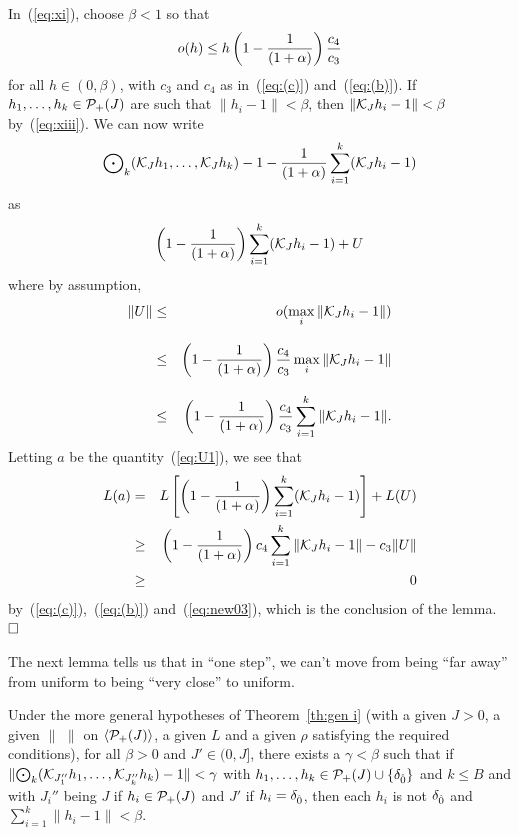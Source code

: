 In~(\ref{eq:xi}), choose $\beta<1$ so that 
$$o(h)\le h \left(1-{1 \over (1+\alpha)}\right) {c_4 \over c_3} $$
for all $h\in (0,\beta)$, with $c_3$ and $c_4$ as in~(\ref{eq:(c)})
and~(\ref{eq:(b)}). If $h_1,\ldots, h_k\in {\cal P}_+(J)$ are such that
$\|h_i-1\| < \beta$, then $\|{\cal K}_J h_i-1\| < \beta$ by~(\ref{eq:xiii}).
We can now write
\begin{equation} \label{eq:U1}
{\bigodot}_k({\cal K}_J h_1,\ldots,{\cal K}_J h_k)-1-
{1 \over (1+\alpha)}\sum_{i=1}^k ({\cal K}_J h_i-1)
\end{equation}
as 
\begin{equation} \label{eq:U2}
\left(1-{1 \over (1+\alpha)}\right)\sum_{i=1}^k ({\cal K}_J h_i-1) +U
\end{equation}
where by assumption,
\begin{eqnarray} \label{eq:new03}
\|U\| & \le & o(\max_i \|{\cal K}_J h_i-1 \|) \\[2ex]
& \le & \left(1-{1 \over (1+\alpha)}\right) {c_4 \over c_3} 
   \max_i \|{\cal K}_J h_i-1 \| \nonumber \\[2ex]
& \le & \left(1-{1 \over (1+\alpha)}\right){c_4 \over c_3} 
   \sum_{i=1}^k \|{\cal K}_J h_i-1 \|. \nonumber
\end{eqnarray}
Letting $a$ be the quantity~(\ref{eq:U1}), we see that
\begin{eqnarray*}
L(a) & = & L \left [ \left ( 1 - {1 \over (1+\alpha)} \right )
   \sum_{i=1}^k ({\cal K}_J h_i-1) \right ] + L(U) \\
& \ge & \left ( 1 - {1 \over (1+\alpha)} \right ) c_4 \sum_{i=1}^k 
   \|{\cal K}_J h_i-1\| -c_3 \|U\| \\
& \geq & 0
\end{eqnarray*}
by~(\ref{eq:(c)}),~(\ref{eq:(b)}) and~(\ref{eq:new03}), 
which is the conclusion of the lemma.  $\qed$

The next lemma tells us that in ``one step'', we can't move from being ``far
away'' from uniform to being ``very close'' to uniform.

\begin{lem} \label{lem:second}
Under the more general hypotheses of Theorem~\ref{th:gen i}
(with a given $J >0$, a given $\|\,\,\|$ on $\langle{\cal P}_+(J)\rangle$, a given $L$ and 
a given $\rho$ satisfying the required conditions), 
for all $\beta>0$ and $J'\in (0,J]$, there exists a $\gamma<\beta$ such that if
$\| {\bigodot}_k ( {\cal K}_{J_1''} h_1 , \ldots , {\cal K}_{J_k''} h_k) - 1 \| <\gamma$ 
with $h_1,\ldots, h_k\in {\cal P}_+(J)\cup \{\delta_{{\hat{0}}}\}$ and $k\le B$
and with $J_i''$ being $J$ if $h_i\in {\cal P}_+(J)$ and $J'$ if $h_i=\delta_{{\hat{0}}}$,
then each $h_i$ is not $\delta_{{\hat{0}}}$ and $\sum_{i=1}^k \| h_i - 1\| < \beta$.
\end{lem}

